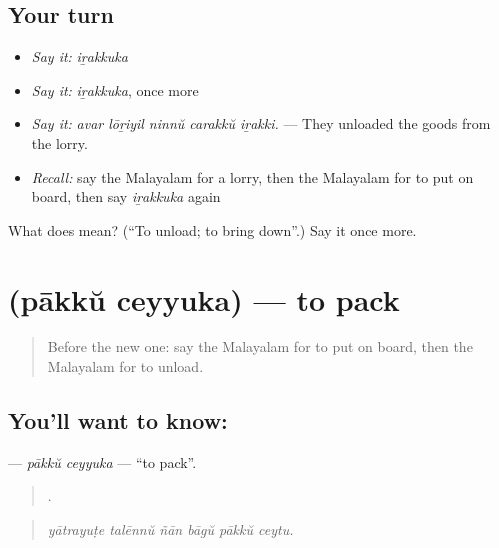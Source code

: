 \subsection*{Your turn}
\begin{itemize}
\raggedright
  \item \emph{Say it:} \emph{iṟakkuka}
  \item \emph{Say it:} \emph{iṟakkuka}, once more
  \item \emph{Say it:} \emph{avar lōṟiyil ninnŭ carakkŭ iṟakki.} — They unloaded the goods from the lorry.
  \item \emph{Recall:} say the Malayalam for a lorry, then the Malayalam for to put on board, then say \emph{iṟakkuka} again
\end{itemize}

\begin{tcolorbox}[breakable,colback=teal!4,colframe=teal!35!black,title={Before you move on}]
What does  mean? (\textquotedblleft{}To unload; to bring down\textquotedblright{}.) Say it once more.
\end{tcolorbox}
\section[\texorpdfstring{\ml{പാക്ക്} \ml{ചെയ്യുക} (pākkŭ ceyyuka)}{പാക്ക് ചെയ്യുക (pākkŭ ceyyuka)}]{  (pākkŭ ceyyuka) — to pack}

\label{lesson:ML-C467-pakku-ceyyuka}



\begin{quote}
Before the new one: say the Malayalam for to put on board, then the Malayalam for to unload.
\end{quote}

\subsection*{You'll want to know:  }
\textbf{ } — \emph{pākkŭ ceyyuka} — \textquotedblleft{}to pack\textquotedblright{}.

\begin{quote}
     .
\end{quote}

\begin{quote}
\emph{yātrayuṭe talēnnŭ ñān bāgŭ pākkŭ ceytu.}
\end{quote}

